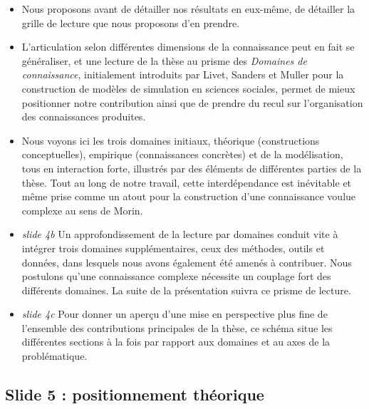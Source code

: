 \documentclass[11pt]{article}
\begin{document}
\begin{itemize}
	\item Nous proposons avant de détailler nos résultats en eux-même, de détailler la grille de lecture que nous proposons d'en prendre.
	\item L'articulation selon différentes dimensions de la connaissance peut en fait se généraliser, et une lecture de la thèse au prisme des \emph{Domaines de connaissance}, initialement introduits par Livet, Sanders et Muller pour la construction de modèles de simulation en sciences sociales, permet de mieux positionner notre contribution ainsi que de prendre du recul sur l'organisation des connaissances produites.
	\item Nous voyons ici les trois domaines initiaux, théorique (constructions conceptuelles), empirique (connaissances concrètes) et de la modélisation, tous en interaction forte, illustrés par des éléments de différentes parties de la thèse. Tout au long de notre travail, cette interdépendance est inévitable et même prise comme un atout pour la construction d'une connaissance voulue complexe au sens de Morin.
	\item \textit{slide 4b} Un approfondissement de la lecture par domaines conduit vite à intégrer trois domaines supplémentaires, ceux des méthodes, outils et données, dans lesquels nous avons également été amenés à contribuer. Nous postulons qu'une connaissance complexe nécessite un couplage fort des différents domaines. La suite de la présentation suivra ce prisme de lecture.
	\item \textit{slide 4c} Pour donner un aperçu d'une mise en perspective plus fine de l'ensemble des contributions principales de la thèse, ce schéma situe les différentes sections à la fois par rapport aux domaines et au axes de la problématique.
\end{itemize}


\subsection*{Slide 5 : positionnement théorique}
\end{document}
